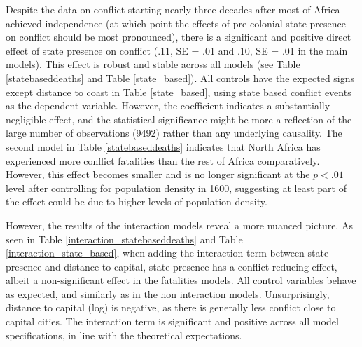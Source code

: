 \documentclass[12pt]{article}
\begin{document}
Despite the data on conflict starting nearly three decades after most of Africa
achieved independence (at which point the effects of pre-colonial state presence
on conflict should be most pronounced), there is a significant
and positive direct effect of state presence on conflict (.11, SE = .01 and .10,
SE = .01 in the main models). This effect is robust and stable across all models
(see Table \ref{statebaseddeaths} and Table \ref{state_based}). All controls
have the expected signs except distance to coast in Table \ref{state_based},
using state based conflict events as the dependent variable. However, the
coefficient indicates a substantially negligible effect, and the statistical
significance might be more a reflection of the large number of observations
(9492) rather than any underlying causality. The second model in Table
\ref{statebaseddeaths} indicates that North Africa has experienced more conflict
fatalities than the rest of Africa comparatively. However, this effect becomes
smaller and is no longer significant at the $ p < .01 $ level after controlling
for population density in 1600, suggesting at least part of the effect could be
due to higher levels of population density.

However, the results of the interaction models reveal a more nuanced picture. As
seen in Table \ref{interaction_statebaseddeaths} and Table
\ref{interaction_state_based}, when adding the interaction term between state
presence and distance to capital, state presence has a conflict reducing effect,
albeit a non-significant effect in the fatalities models. All control variables
behave as expected, and similarly as in the non interaction models.
Unsurprisingly, distance to capital (log) is negative, as there is generally
less conflict close to capital cities. The interaction term is significant
and positive across all model specifications, in line with the theoretical
expectations. 
\end{document}
